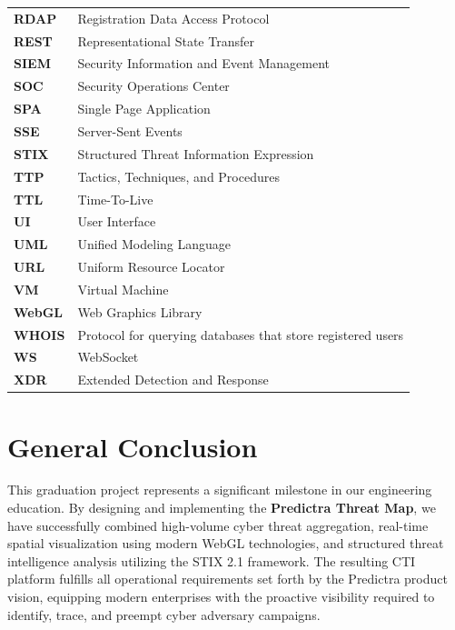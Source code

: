 \documentclass[12pt,a4paper,oneside]{book}
\begin{document}
\begin{longtable}{ll}
\textbf{RDAP} & Registration Data Access Protocol \\
\textbf{REST} & Representational State Transfer \\
\textbf{SIEM} & Security Information and Event Management \\
\textbf{SOC} & Security Operations Center \\
\textbf{SPA} & Single Page Application \\
\textbf{SSE} & Server-Sent Events \\
\textbf{STIX} & Structured Threat Information Expression \\
\textbf{TTP} & Tactics, Techniques, and Procedures \\
\textbf{TTL} & Time-To-Live \\
\textbf{UI} & User Interface \\
\textbf{UML} & Unified Modeling Language \\
\textbf{URL} & Uniform Resource Locator \\
\textbf{VM} & Virtual Machine \\
\textbf{WebGL} & Web Graphics Library \\
\textbf{WHOIS} & Protocol for querying databases that store registered users \\
\textbf{WS} & WebSocket \\
\textbf{XDR} & Extended Detection and Response \\
\end{longtable}

\mainmatter
\fancyfoot[C]{\thepage}









\backmatter

\chapter*{General Conclusion}
This graduation project represents a significant milestone in our engineering education. By designing and implementing the \textbf{Predictra Threat Map}, we have successfully combined high-volume cyber threat aggregation, real-time spatial visualization using modern WebGL technologies, and structured threat intelligence analysis utilizing the STIX 2.1 framework. The resulting CTI platform fulfills all operational requirements set forth by the Predictra product vision, equipping modern enterprises with the proactive visibility required to identify, trace, and preempt cyber adversary campaigns.
\end{document}
